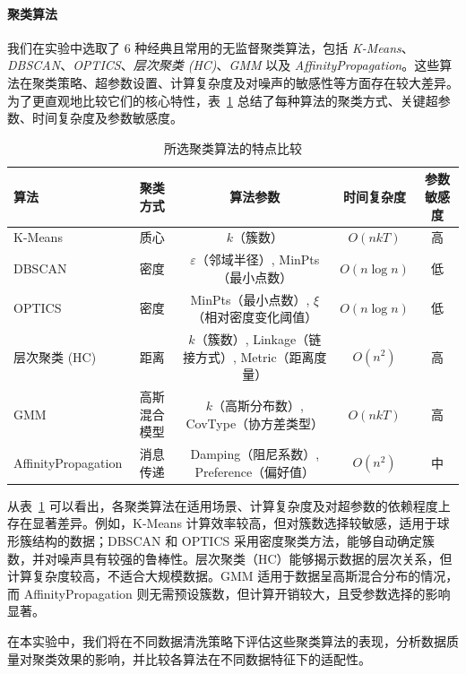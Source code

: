 \documentclass[10pt]{article} %
\numberwithin{equation}{section}
\begin{document}
\paragraph{聚类算法}
我们在实验中选取了 6 种经典且常用的无监督聚类算法，包括 \textit{K-Means}、\textit{DBSCAN}、\textit{OPTICS}、\textit{层次聚类 (HC)}、\textit{GMM} 以及 \textit{AffinityPropagation}。这些算法在聚类策略、超参数设置、计算复杂度及对噪声的敏感性等方面存在较大差异。为了更直观地比较它们的核心特性，表~\ref{tab:clustering_algorithms} 总结了每种算法的聚类方式、关键超参数、时间复杂度及参数敏感度。

\begin{table}[htbp]
    \centering
    \begin{tabular}{lcccc}
        \toprule
        \textbf{算法} & \textbf{聚类方式} & \textbf{算法参数} & \textbf{时间复杂度} & \textbf{参数敏感度} \\
        \midrule
        K-Means & 质心 & $k$（簇数） & $O(nkT)$ & 高 \\
        DBSCAN & 密度 & $\varepsilon$（邻域半径）, MinPts（最小点数） & $O(n \log n)$ & 低 \\
        OPTICS & 密度 & MinPts（最小点数）, $\xi$（相对密度变化阈值） & $O(n \log n)$ & 低 \\
        层次聚类 (HC) & 距离 & $k$（簇数）, Linkage（链接方式）, Metric（距离度量） & $O(n^2)$ & 高 \\
        GMM & 高斯混合模型 & $k$（高斯分布数）, CovType（协方差类型） & $O(nkT)$ & 高 \\
        AffinityPropagation & 消息传递 & Damping（阻尼系数）, Preference（偏好值） & $O(n^2)$ & 中 \\
        \bottomrule
    \end{tabular}
    \caption{所选聚类算法的特点比较}
    \label{tab:clustering_algorithms}
\end{table}

\noindent
从表~\ref{tab:clustering_algorithms} 可以看出，各聚类算法在适用场景、计算复杂度及对超参数的依赖程度上存在显著差异。例如，K-Means 计算效率较高，但对簇数选择较敏感，适用于球形簇结构的数据；DBSCAN 和 OPTICS 采用密度聚类方法，能够自动确定簇数，并对噪声具有较强的鲁棒性。层次聚类（HC）能够揭示数据的层次关系，但计算复杂度较高，不适合大规模数据。GMM 适用于数据呈高斯混合分布的情况，而 AffinityPropagation 则无需预设簇数，但计算开销较大，且受参数选择的影响显著。

在本实验中，我们将在不同数据清洗策略下评估这些聚类算法的表现，分析数据质量对聚类效果的影响，并比较各算法在不同数据特征下的适配性。
\end{document}
